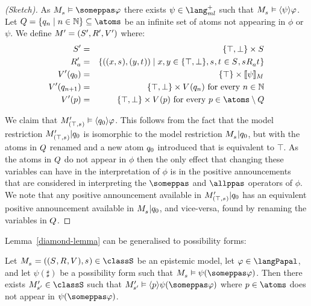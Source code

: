 \begin{proof}[(Sketch)]
As $\kPModel{\kStateS} \entails \someppas \phi$ there exists $\psi \in \langMlPlus$ such that $\kPModel{\kStateS} \entails \announceE{\psi} \phi$.
Let $\atomsQ = \{\atomQ_n \mid n \in \naturals\} \subseteq \atoms$ be an infinite set of atoms not appearing in $\phi$ or $\psi$.
We define $\kModelAndTupleP$ where:
\begin{eqnarray*}
    \kStatesP &=& \{\top, \bot\} \times \kStates\\
    \kAccessibilityP{\agentA} &=& \{((x, \kStateS), (y, \kStateT)) \mid x, y \in \{\top, \bot\}, \kStateS, \kStateT \in \kStates, \kStateS \kAccessibility{\agentA} \kStateT \}\\
    \kValuationP(\atomQ_0) &=& \{\top\} \times \interpretation[\kModel]{\psi}\\
    \kValuationP(\atomQ_{n + 1}) &=&  \{\top, \bot\} \times \kValuation(\atomQ_n) \text{ for every } n \in \naturals\\
    \kValuationP(\atomP) &=& \{\top, \bot\} \times \kValuation(\atomP) \text{ for every } \atomP \in \atoms \setminus \atomsQ
\end{eqnarray*}

We claim that $\kPModelP{(\top, \kStateS)} \entails \announceE{\atomQ_0} \phi$.
This follows from the fact that the model restriction $\restrict{\kPModelP{(\top, \kStateS)}}{\atomQ_0}$ is isomorphic to the model restriction $\restrict{\kPModel{\kStateS}}{\atomQ_0}$, but with the atoms in $Q$ renamed and a new atom $q_0$ introduced that is equivalent to $\top$.
As the atoms in $Q$ do not appear in $\phi$ then the only effect that changing these variables can have in the interpretation of $\phi$ is in the positive announcements that are considered in interpreting the $\someppas$ and $\allppas$ operators of $\phi$.
We note that any positive announcement available in $\restrict{\kPModelP{(\top, \kStateS)}}{\atomQ_0}$ has an equivalent positive announcement available in $\restrict{\kPModel{\kStateS}}{\atomQ_0}$, and vice-versa, found by renaming the variables in $Q$.
\end{proof}

Lemma~\ref{diamond-lemma} can be generalised to possibility forms:

\begin{lemma}\label{possibility-lemma}
Let $\kPModelAndTuple{\kStateS} \in \classS$ be an epistemic model,
let $\phi \in \langPapal$, and
let $\psi(\sharp)$ be a possibility form such that $\kPModel{\kStateS} \entails \psi(\someppas \phi)$.
Then there exists $\kPModelP{\kStateSP} \in \classS$ such that $\kPModelP{\kStateSP} \entails \announceE{\atomP} \psi(\someppas \phi)$ where $\atomP \in \atoms$ does not appear in $\psi(\someppas \phi)$.
\end{lemma}

